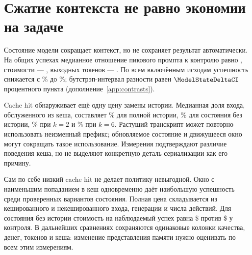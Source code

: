 \section{Сжатие контекста не равно экономии на задаче}
\label{sec:economics}
Состояние модели сокращает контекст, но не сохраняет результат автоматически. На общих успехах медианное отношение пикового промпта к контролю равно \ModelStatePeakRatio{}, стоимости --- \ModelStateCostRatio{}, выходных токенов --- \ModelStateOutputRatio{}. По всем включённым исходам успешность снижается с \ModelControlRate\% до \ModelStateRate\%; бутстрэп-интервал разности равен $\ModelStateDeltaCI$ процентного пункта (дополнение~\ref{app:contrasts}).

Cache hit обнаруживает ещё одну цену замены истории. Медианная доля входа, обслуженного из кеша, составляет \ModelControlCacheHit\% для полной истории, \ModelStateCacheHit\% для состояния без истории, \ModelHistoryTwoCacheHit\% при $k=2$ и \ModelHistorySixCacheHit\% при $k=6$. Растущий транскрипт может повторно использовать неизменный префикс; обновляемое состояние и движущееся окно могут сокращать такое использование. Измерения подтверждают различие поведения кеша, но не выделяют конкретную деталь сериализации как его причину.

Сам по себе низкий cache hit не делает политику невыгодной. Окно с наименьшим попаданием в кеш одновременно даёт наибольшую успешность среди проверенных вариантов состояния. Полная цена складывается из кешированного и некешированного входа, генерации и числа действий. Для состояния без истории стоимость на наблюдаемый успех равна \$\ModelStateCostPerSuccess{} против \$\ModelControlCostPerSuccess{} у контроля. В дальнейших сравнениях сохраняются одинаковые колонки качества, денег, токенов и кеша: изменение представления памяти нужно оценивать по всем этим измерениям.
